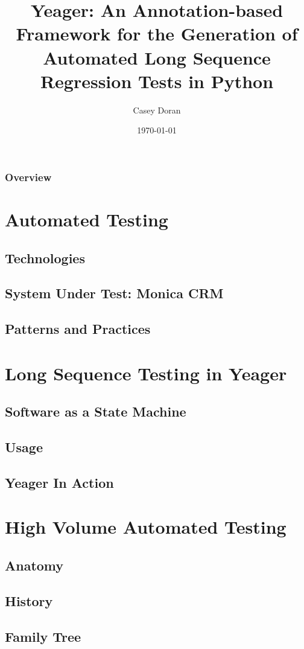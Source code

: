 \documentclass{beamer}
\title[Yeager]{Yeager: An Annotation-based Framework for the Generation of Automated Long Sequence Regression Tests in Python}
\author{Casey Doran}
\institute[Florida Tech]
{
Florida Institute of Technology \\
\medskip
\textit{cdoran2011@my.fit.edu}
}
\date{\today}
\begin{document}
\begin{frame}
\titlepage
\end{frame}

\begin{frame}
\frametitle{Overview}
\tableofcontents
\end{frame}
\section{Automated Testing}

\subsection{Technologies}
\subsection{System Under Test: Monica CRM}
\subsection{Patterns and Practices}

\section{Long Sequence Testing in Yeager}
\subsection{Software as a State Machine}
\subsection{Usage}
\subsection{Yeager In Action}

\section{High Volume Automated Testing}
\subsection{Anatomy}
\subsection{History}
\subsection{Family Tree}
\end{document}
